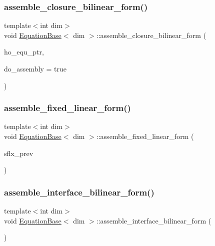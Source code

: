 \subsubsection{\texorpdfstring{assemble\+\_\+closure\+\_\+bilinear\+\_\+form()}{assemble\_closure\_bilinear\_form()}}
{\footnotesize\ttfamily template$<$int dim$>$ \\
void \hyperlink{class_equation_base}{Equation\+Base}$<$ dim $>$\+::assemble\+\_\+closure\+\_\+bilinear\+\_\+form (\begin{DoxyParamCaption}\item[{std\+\_\+cxx11\+::shared\+\_\+ptr$<$ \hyperlink{class_equation_base}{Equation\+Base}$<$ dim $>$ $>$}]{ho\+\_\+equ\+\_\+ptr,  }\item[{bool}]{do\+\_\+assembly = {\ttfamily true} }\end{DoxyParamCaption})}

\mbox{\label{class_equation_base_aa6a5d3dd752c1e2389b329c141c44ee7}} 
\subsubsection{\texorpdfstring{assemble\+\_\+fixed\+\_\+linear\+\_\+form()}{assemble\_fixed\_linear\_form()}}
{\footnotesize\ttfamily template$<$int dim$>$ \\
void \hyperlink{class_equation_base}{Equation\+Base}$<$ dim $>$\+::assemble\+\_\+fixed\+\_\+linear\+\_\+form (\begin{DoxyParamCaption}\item[{std\+::vector$<$ Vector$<$ double $>$ $>$ \&}]{sflx\+\_\+prev }\end{DoxyParamCaption})\hspace{0.3cm}{\ttfamily [virtual]}}

\mbox{\label{class_equation_base_ac590b2065d95ea03fcf411c965e6cfd9}} 
\subsubsection{\texorpdfstring{assemble\+\_\+interface\+\_\+bilinear\+\_\+form()}{assemble\_interface\_bilinear\_form()}}
{\footnotesize\ttfamily template$<$int dim$>$ \\
void \hyperlink{class_equation_base}{Equation\+Base}$<$ dim $>$\+::assemble\+\_\+interface\+\_\+bilinear\+\_\+form (\begin{DoxyParamCaption}{ }\end{DoxyParamCaption})\hspace{0.3cm}{\ttfamily [virtual]}}



